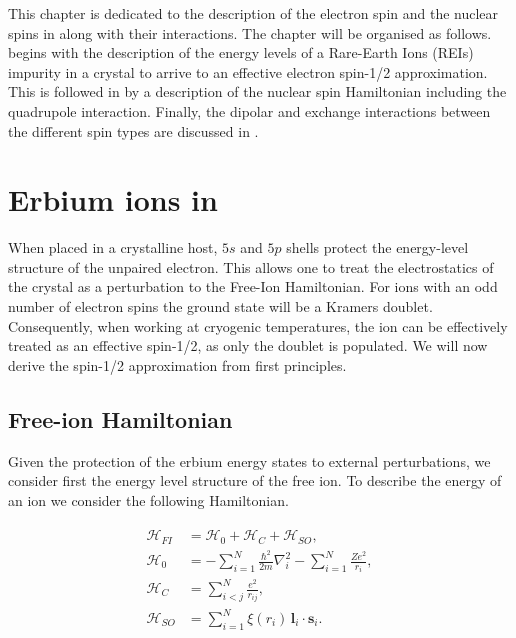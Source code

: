 This chapter is dedicated to the description of the \Er electron spin and the nuclear spins in \Ca along with their interactions. The chapter will be organised as follows.  begins with the description of the energy levels of a Rare-Earth Ions (REIs) impurity in a crystal to arrive to an effective electron spin-1/2 approximation. This is followed in  by a description of the nuclear spin Hamiltonian including the quadrupole interaction. Finally, the dipolar and exchange interactions between the different spin types are discussed in .

\section{Erbium ions in \Ca}

When placed in a crystalline host, $5s$ and $5p$ shells protect the energy-level structure of the unpaired electron. This allows one to treat the electrostatics of the crystal as a perturbation to the Free-Ion Hamiltonian. For ions with an odd number of electron spins the ground state will be a Kramers doublet. Consequently, when working at cryogenic temperatures, the ion can be effectively treated as an effective spin-1/2, as only the doublet is populated. We will now derive the spin-1/2 approximation from first principles.

\subsection{Free-ion Hamiltonian}

Given the protection of the erbium energy states to external perturbations, we consider first the energy level structure of the free \Er ion. To describe the energy of an ion we consider the following Hamiltonian.

\begin{align}
\begin{split}
\mathcal{H}_{FI} &= \mathcal{H}_0 + \mathcal{H}_C + \mathcal{H}_{SO}, \\
\mathcal{H}_0 &= - \sum_{i=1}^N \frac{\hbar^2}{2m} \nabla_i^2 
- \sum_{i=1}^N \frac{Ze^2}{r_i}, \\
\mathcal{H}_C &= \sum_{i<j}^N \frac{e^2}{r_{ij}}, \\
\mathcal{H}_{SO} &= \sum_{i=1}^N \xi(r_i)\,\mathbf{l}_i \cdot \mathbf{s}_i.
\end{split}
\end{align}

